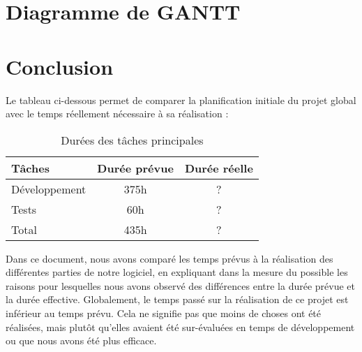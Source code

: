 \documentclass[a4paper]{report}
\begin{document}
\chapter{Diagramme de GANTT}


\chapter{Conclusion}

Le tableau ci-dessous permet de comparer la planification initiale du projet global avec le temps réellement nécessaire à sa réalisation :

\begin{table}[H]
\centering
  \begin{tabularx}{0.8\textwidth}{| X | c | c |}
    \hline
	Tâches & Durée prévue & Durée réelle \\
    \hline
    Développement & 375h & ?\\
    Tests & 60h & ?\\
    \hline
	Total & 435h & ?\\
    \hline
  \end{tabularx}
  \caption{Durées des tâches principales}
\end{table}

Dans ce document, nous avons comparé les temps prévus à la réalisation des différentes parties de notre logiciel, en expliquant dans la mesure du possible les raisons pour lesquelles nous avons observé des différences entre la durée prévue et la durée effective.
Globalement, le temps passé sur la réalisation de ce projet est inférieur au temps prévu.
Cela ne signifie pas que moins de choses ont été réalisées, mais plutôt qu'elles avaient été sur-évaluées en temps de développement ou que nous avons été plus efficace.
\end{document}
